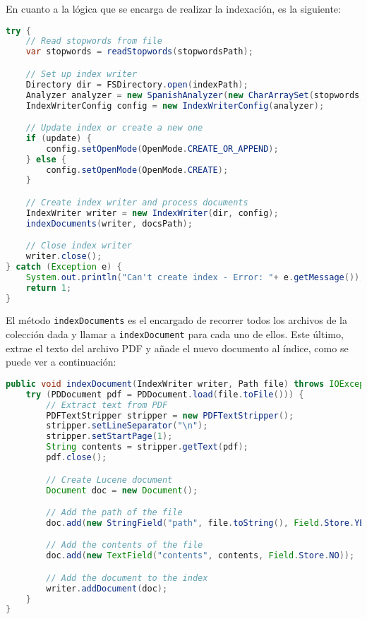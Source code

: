 En cuanto a la lógica que se encarga de realizar la indexación, es la siguiente:

\begin{lstlisting}[language=Java]
try {
    // Read stopwords from file
    var stopwords = readStopwords(stopwordsPath);

    // Set up index writer
    Directory dir = FSDirectory.open(indexPath);
    Analyzer analyzer = new SpanishAnalyzer(new CharArraySet(stopwords, true));
    IndexWriterConfig config = new IndexWriterConfig(analyzer);

    // Update index or create a new one
    if (update) {
        config.setOpenMode(OpenMode.CREATE_OR_APPEND);
    } else {
        config.setOpenMode(OpenMode.CREATE);
    }

    // Create index writer and process documents
    IndexWriter writer = new IndexWriter(dir, config);
    indexDocuments(writer, docsPath);

    // Close index writer
    writer.close();
} catch (Exception e) {
    System.out.println("Can't create index - Error: "+ e.getMessage());
    return 1;
}
\end{lstlisting}

El método \verb|indexDocuments| es el encargado de recorrer todos los archivos de la colección dada y llamar a \verb|indexDocument| para cada uno de ellos. Este último, extrae el texto del archivo PDF y añade el nuevo documento al índice, como se puede ver a continuación:

\begin{lstlisting}[language=Java]
public void indexDocument(IndexWriter writer, Path file) throws IOException {
    try (PDDocument pdf = PDDocument.load(file.toFile())) {
        // Extract text from PDF
        PDFTextStripper stripper = new PDFTextStripper();
        stripper.setLineSeparator("\n");
        stripper.setStartPage(1);
        String contents = stripper.getText(pdf);
        pdf.close();

        // Create Lucene document
        Document doc = new Document();

        // Add the path of the file
        doc.add(new StringField("path", file.toString(), Field.Store.YES));

        // Add the contents of the file
        doc.add(new TextField("contents", contents, Field.Store.NO));

        // Add the document to the index
        writer.addDocument(doc);
    }
}
\end{lstlisting}

